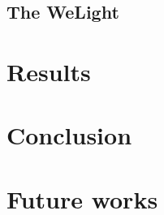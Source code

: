 \documentclass[a4paper, 10pt]{article}
\begin{document}
\subsection{The WeLight}
\label{sec:WeLight}



\section{Results}
\label{sec:results}




\section{Conclusion}
\label{sec:conclusion}



\section{Future works}
\label{sec:future}






\end{document}
